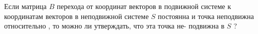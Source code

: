 Если матрица $B$ перехода от координат векторов в подвижной системе 
к координатам векторов в неподвижной системе $S$ постоянна и точка 
неподвижна относительно  , то можно ли утверждать, что эта точка не-
подвижна в $S$ ?
